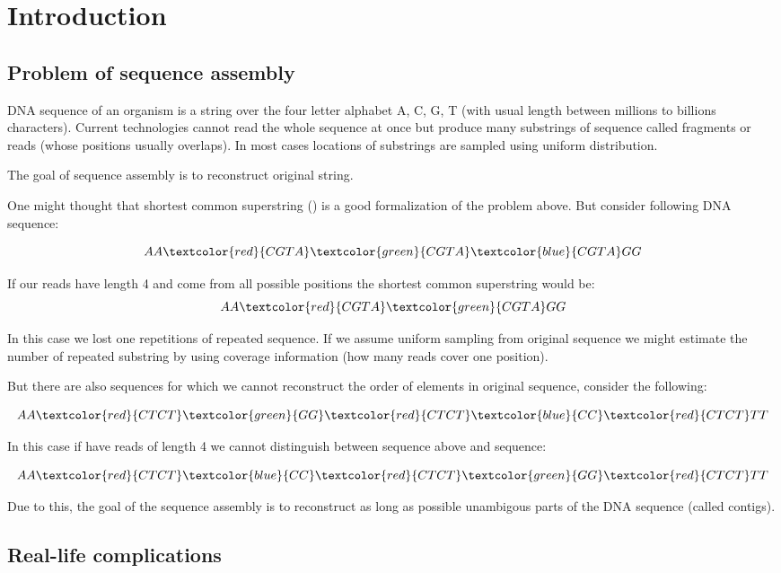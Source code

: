 \chapter{Introduction}

\section{Problem of sequence assembly}

DNA sequence of an organism is a string over the four letter alphabet A, C, G, T
(with usual length between millions to billions characters).
Current technologies cannot read the whole sequence at once but produce many
substrings of sequence called fragments or reads (whose positions usually overlaps).
In most cases locations of substrings are sampled using uniform distribution.

The goal of sequence assembly is to reconstruct original string.

One might thought that shortest common superstring (\cite{maier1977note}) 
is a good formalization of the problem above. But consider following DNA sequence:

$$AA\textcolor{red}{CGTA}\textcolor{green}{CGTA}\textcolor{blue}{CGTA}GG$$

If our reads have length 4 and come from all possible positions the shortest
common superstring would be:
$$AA\textcolor{red}{CGTA}\textcolor{green}{CGTA}GG$$

In this case we lost one repetitions of repeated sequence. If we assume uniform
sampling from original sequence we might estimate the number of repeated substring
by using coverage information (how many reads cover one position).

But there are also sequences for which we cannot reconstruct the order of elements in
original sequence, consider the following:

$$AA\textcolor{red}{CTCT}\textcolor{green}{GG}\textcolor{red}{CTCT}\textcolor{blue}{CC}\textcolor{red}{CTCT}TT$$

In this case if have reads of length 4 we cannot distinguish between sequence above and
sequence:

$$AA\textcolor{red}{CTCT}\textcolor{blue}{CC}\textcolor{red}{CTCT}\textcolor{green}{GG}\textcolor{red}{CTCT}TT$$

Due to this, the goal of the sequence assembly is to reconstruct as long as possible
unambigous parts of the DNA sequence (called contigs).

\section{Real-life complications}

